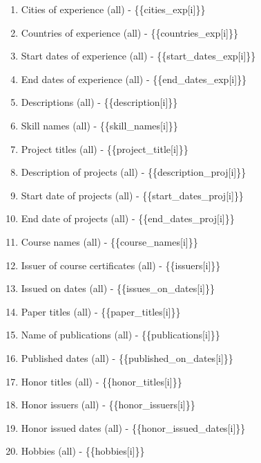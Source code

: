 \begin{enumerate}
\item
  Cities of experience (all) - \{\{cities\_exp{[}i{]}\}\}
\item
  Countries of experience (all) - \{\{countries\_exp{[}i{]}\}\}
\item
  Start dates of experience (all) - \{\{start\_dates\_exp{[}i{]}\}\}
\item
  End dates of experience (all) - \{\{end\_dates\_exp{[}i{]}\}\}
\item
  Descriptions (all) - \{\{description{[}i{]}\}\}
\item
  Skill names (all) - \{\{skill\_names{[}i{]}\}\}
\item
  Project titles (all) - \{\{project\_title{[}i{]}\}\}
\item
  Description of projects (all) - \{\{description\_proj{[}i{]}\}\}
\item
  Start date of projects (all) - \{\{start\_dates\_proj{[}i{]}\}\}
\item
  End date of projects (all) - \{\{end\_dates\_proj{[}i{]}\}\}
\item
  Course names (all) - \{\{course\_names{[}i{]}\}\}
\item
  Issuer of course certificates (all) - \{\{issuers{[}i{]}\}\}
\item
  Issued on dates (all) - \{\{issues\_on\_dates{[}i{]}\}\}
\item
  Paper titles (all) - \{\{paper\_titles{[}i{]}\}\}
\item
  Name of publications (all) - \{\{publications{[}i{]}\}\}
\item
  Published dates (all) - \{\{published\_on\_dates{[}i{]}\}\}
\item
  Honor titles (all) - \{\{honor\_titles{[}i{]}\}\}
\item
  Honor issuers (all) - \{\{honor\_issuers{[}i{]}\}\}
\item
  Honor issued dates (all) - \{\{honor\_issued\_dates{[}i{]}\}\}
\item
  Hobbies (all) - \{\{hobbies{[}i{]}\}\}
\end{enumerate}
